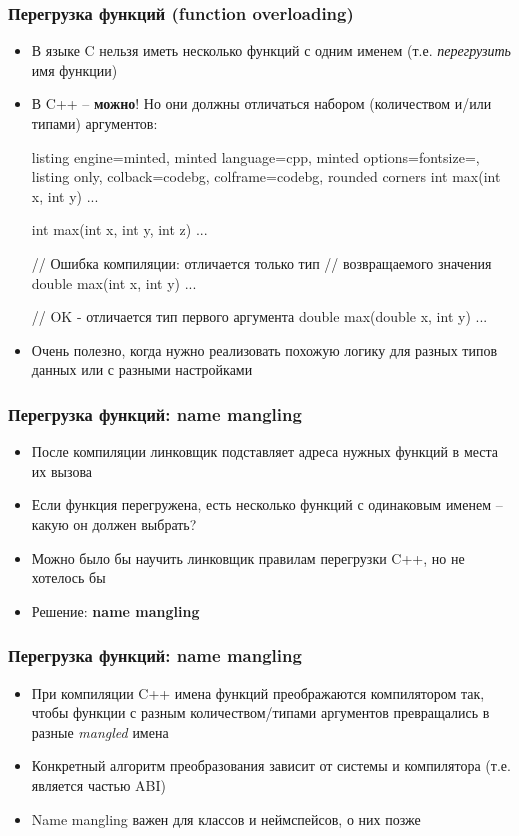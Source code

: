 \documentclass[10pt]{beamer}
\begin{document}
\begin{frame}[fragile]
\frametitle{Перегрузка функций (function overloading)}
\begin{itemize}
\item В языке C нельзя иметь несколько функций с одним именем (т.е. \textit{перегрузить} имя функции)
\pause
\item В C++ -- \textbf{можно}! Но они должны отличаться набором (количеством и/или типами) аргументов:
\begin{tcblisting}{listing engine=minted, minted language=cpp, minted options={fontsize=\scriptsize}, listing only, colback=codebg, colframe=codebg, rounded corners}
int max(int x, int y) { ... }

int max(int x, int y, int z) { ... }

// Ошибка компиляции: отличается только тип
// возвращаемого значения
double max(int x, int y) { ... }

// OK - отличается тип первого аргумента
double max(double x, int y) { ... }
\end{tcblisting}
\pause
\item Очень полезно, когда нужно реализовать похожую логику для разных типов данных или с разными настройками
\end{itemize}
\end{frame}

\begin{frame}[fragile]
\frametitle{Перегрузка функций: name mangling}
\begin{itemize}
\item После компиляции линковщик подставляет адреса нужных функций в места их вызова
\pause
\item Если функция перегружена, есть несколько функций с одинаковым именем -- какую он должен выбрать?
\pause
\item Можно было бы научить линковщик правилам перегрузки C++, но не хотелось бы
\pause
\item Решение: \textbf{name mangling}
\end{itemize}
\end{frame}

\begin{frame}[fragile]
\frametitle{Перегрузка функций: name mangling}
\begin{itemize}
\item При компиляции C++ имена функций преображаются компилятором так, чтобы функции с разным количеством/типами аргументов превращались в разные \textit{mangled} имена
\pause
\item Конкретный алгоритм преобразования зависит от системы и компилятора (т.е. является частью ABI)
\pause
\item Name mangling важен для классов и неймспейсов, о них позже
\end{itemize}
\end{frame}
\end{document}
